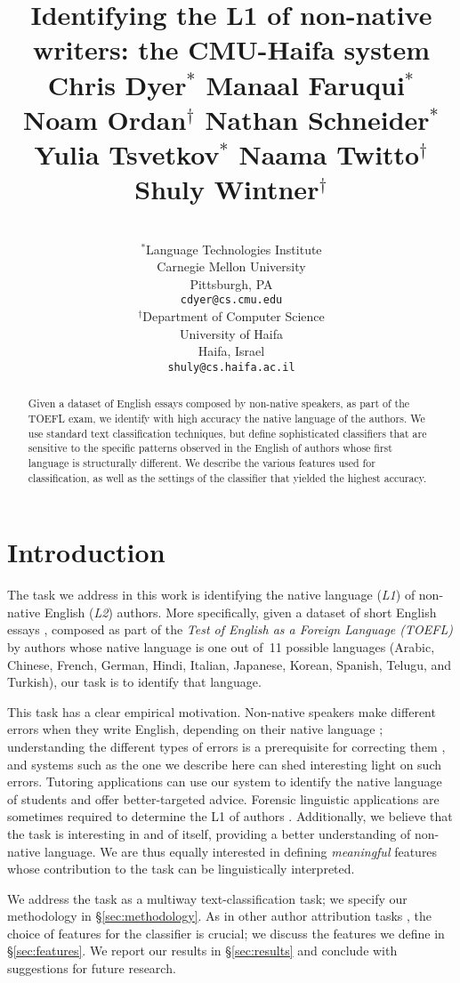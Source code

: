 \documentclass[11pt,letterpaper]{article}
\title{Identifying the L1 of non-native writers: the CMU-Haifa system\\[1em]
{\large Chris Dyer$^\ast$ Manaal Faruqui$^\ast$ Noam Ordan$^\dagger$ Nathan Schneider$^\ast$\\ Yulia Tsvetkov$^\ast$ Naama Twitto$^\dagger$ Shuly Wintner$^\dagger$}\\[-3em]
}
\author{
\\
$^\ast$Language Technologies Institute\\Carnegie Mellon University\\Pittsburgh, PA\\\texttt{cdyer@cs.cmu.edu}
\And
\\
$^\dagger$Department of Computer Science\\University of Haifa\\Haifa, Israel\\\texttt{shuly@cs.haifa.ac.il}
%
%
%
%
}
\date{}
\newcommand{\Sref}[1]{\S\ref{#1}}
\begin{document}
\maketitle
\begin{abstract}
Given a dataset of English essays composed by non-native speakers, as
part of the TOEFL exam, we identify with high accuracy the native
language of the authors. We use standard text classification
techniques, but define sophisticated classifiers that are sensitive to
the specific patterns observed in the English of authors whose first
language is structurally different. We describe the various features
used for classification, as well as the settings of the classifier
that yielded the highest accuracy.
\end{abstract}

\section{Introduction}
\label{sec:intro}
The task we address in this work is identifying the native language
(\emph{L1}) of non-native English (\emph{L2}) authors. More specifically, given a
dataset of short English essays
\citep{blanchard-tetreault-higgins-cahill-chodorow:2013:TOEFL11-RR},
composed as part of the \emph{Test of English as a Foreign Language
  (TOEFL)} by authors whose native language is one out of~11 possible
languages (Arabic, Chinese, French, German, Hindi, Italian, Japanese,
Korean, Spanish, Telugu, and Turkish), our task is to identify that
language.

This task has a clear empirical motivation. Non-native speakers make
different errors when they write English, depending on their native
language \citep{swan2001learner}; understanding the different types of
errors is a prerequisite for correcting them
\citep{Leacock:2010:AGE:1855062}, and systems such as the one we
describe here can shed interesting light on such errors. Tutoring
applications can use our system to identify the native language of
students and offer better-targeted advice. Forensic linguistic
applications are sometimes required to determine the L1 of authors
\citep{estival-gaustad-pham-radford-hutchinson:2007:ALTA2007,estival2007author}. Additionally,
we believe that the task is interesting in and of itself, providing a
better understanding of non-native language. We are thus equally
interested in defining \emph{meaningful} features whose contribution
to the task can be linguistically interpreted.

We address the task as a multiway text-classification task; we specify
our methodology in \Sref{sec:methodology}. As in other author
attribution tasks \citep{joula:2006}, the choice of features for the
classifier is crucial; we discuss the features we define in
\Sref{sec:features}. We report our results in
\Sref{sec:results} and conclude with suggestions for future
research.
\end{document}
